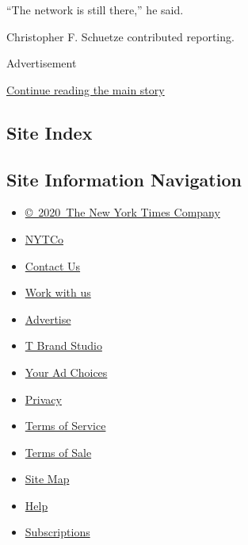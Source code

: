 ``The network is still there,'' he said.

Christopher F. Schuetze contributed reporting.

Advertisement

\protect\hyperlink{after-bottom}{Continue reading the main story}

\hypertarget{site-index}{%
\subsection{Site Index}\label{site-index}}

\hypertarget{site-information-navigation}{%
\subsection{Site Information
Navigation}\label{site-information-navigation}}

\begin{itemize}
\tightlist
\item
  \href{https://help.nytimes.com/hc/en-us/articles/115014792127-Copyright-notice}{©~2020~The
  New York Times Company}
\end{itemize}

\begin{itemize}
\tightlist
\item
  \href{https://www.nytco.com/}{NYTCo}
\item
  \href{https://help.nytimes.com/hc/en-us/articles/115015385887-Contact-Us}{Contact
  Us}
\item
  \href{https://www.nytco.com/careers/}{Work with us}
\item
  \href{https://nytmediakit.com/}{Advertise}
\item
  \href{http://www.tbrandstudio.com/}{T Brand Studio}
\item
  \href{https://www.nytimes.com/privacy/cookie-policy\#how-do-i-manage-trackers}{Your
  Ad Choices}
\item
  \href{https://www.nytimes.com/privacy}{Privacy}
\item
  \href{https://help.nytimes.com/hc/en-us/articles/115014893428-Terms-of-service}{Terms
  of Service}
\item
  \href{https://help.nytimes.com/hc/en-us/articles/115014893968-Terms-of-sale}{Terms
  of Sale}
\item
  \href{https://spiderbites.nytimes.com}{Site Map}
\item
  \href{https://help.nytimes.com/hc/en-us}{Help}
\item
  \href{https://www.nytimes.com/subscription?campaignId=37WXW}{Subscriptions}
\end{itemize}
